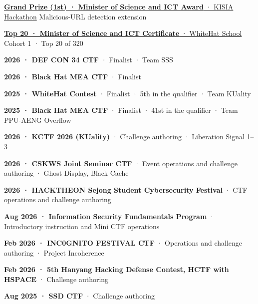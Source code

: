   {\href{https://www.boannews.com/media/view.asp?idx=132213\&direct=mobile}{\textbf{Grand Prize (1st) · Minister of Science and ICT Award} · KISIA Hackathon}}
  {Malicious-URL detection extension}

  {\href{https://www.msit.go.kr/bbs/view.do?sCode=user\&mId=113\&mPid=238\&bbsSeqNo=94\&nttSeqNo=3184227}{\textbf{Top 20 · Minister of Science and ICT Certificate} · WhiteHat School}}
  {Cohort 1 · Top 20 of 320}


\begin{cvlist}
  \item \textbf{2026 · DEF CON 34 CTF} · Finalist · Team SSS
  \item \textbf{2026 · Black Hat MEA CTF} · Finalist
  \item \textbf{2025 · WhiteHat Contest} · Finalist · 5th in the qualifier · Team KUality
  \item \textbf{2025 · Black Hat MEA CTF} · Finalist · 41st in the qualifier · Team PPU-AENG Overflow
\end{cvlist}


\begin{cvlist}
  \item \textbf{2026 · KCTF 2026 (KUality)} · Challenge authoring · Liberation Signal 1--3
  \item \textbf{2026 · CSKWS Joint Seminar CTF} · Event operations and challenge authoring · Ghost Display, Black Cache
  \item \textbf{2026 · HACKTHEON Sejong Student Cybersecurity Festival} · CTF operations and challenge authoring
  \item \textbf{Aug 2026 · Information Security Fundamentals Program} · Introductory instruction and Mini CTF operations
  \item \textbf{Feb 2026 · INC0GNITO FESTIVAL CTF} · Operations and challenge authoring · Project Incoherence
  \item \textbf{Feb 2026 · 5th Hanyang Hacking Defense Contest, HCTF with HSPACE} · Challenge authoring
  \item \textbf{Aug 2025 · SSD CTF} · Challenge authoring
\end{cvlist}

